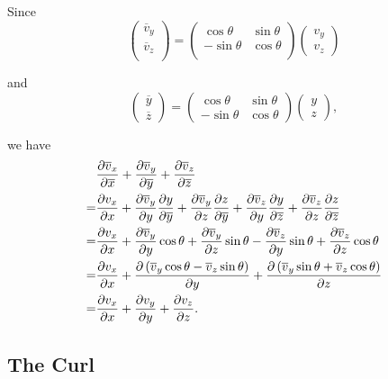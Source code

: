         \begin{sol}[1.17]
        Since
            \begin{equation}
                \begin{pmatrix}
                    \overline{v}_y \\
                    \overline{v}_z \\
                \end{pmatrix}
        = \begin{pmatrix}
            \cos \theta & \sin \theta\\
            -\sin\theta & \cos \theta\\
        \end{pmatrix}
        \begin{pmatrix}
            v_y \\ v_z
        \end{pmatrix}
    \end{equation}

    and
    \begin{equation}
        \begin{pmatrix}
            \overline{y} \\ \overline{z}
        \end{pmatrix}
        = \begin{pmatrix}
            \cos \theta & \sin \theta \\
            -\sin \theta & \cos \theta
        \end{pmatrix}
        \begin{pmatrix}
            y \\ z
        \end{pmatrix},
    \end {equation}

    we have
        \begin{equation}
            \begin{aligned}
                &\frac{\partial \overline{v}_x}{\partial \overline{x}} + \frac{\partial \overline{v}_y}{\partial \overline{y}} + \frac{\partial \overline{v}_z}{\partial \overline{z}} \\
                =&\frac{\partial v_x}{\partial x} + \frac{\partial \overline{v}_y}{\partial y}\frac{\partial y}{\partial \overline{y}} + \frac{\partial \overline{v}_y}{\partial z}\frac{\partial z}{\partial \overline{y}}
                    + \frac{\partial \overline{v}_z}{\partial y}\frac{\partial y}{\partial \overline{z}} + \frac{\partial \overline{v}_z}{\partial z}\frac{\partial z}{\partial \overline{z}} \\
                =&\frac{\partial v_x}{\partial x} + \frac{\partial \overline{v}_y}{\partial y}\cos \theta 
                    + \frac{\partial \overline{v}_y}{\partial z}\sin \theta - \frac{\partial \overline{v}_z}{\partial y} \sin \theta + \frac{\partial \overline{v}_z}{\partial z} \cos \theta \\
                =&\frac{\partial v_x}{\partial x}+\frac{\partial \left(\overline{v}_y\cos\theta - \overline{v}_z\sin\theta\right)}{\partial y} + \frac{\partial \left(\overline{v}_y\sin\theta + \overline{v}_z\cos\theta\right)}{\partial z} \\
                =&\frac{\partial v_x}{\partial x}+\frac{\partial v_y}{\partial y} + \frac{\partial v_z}{\partial z}.
            \end{aligned}
        \end{equation}
\end{sol}

    \subsection{The Curl}

